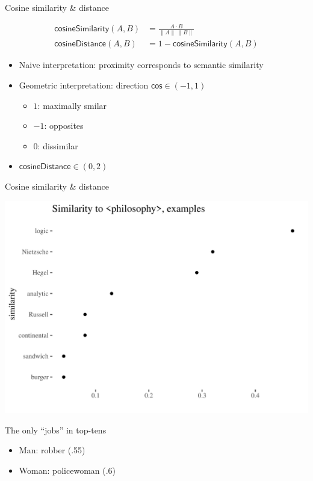 \documentclass[
  10pt,
  ignorenonframetext,
  x11names, dvipsnames, bibspacing,natbib, table]{beamer}
\providecommand{\tightlist}{%
  \setlength{\itemsep}{0pt}\setlength{\parskip}{0pt}}
\begin{document}
\begin{frame}{Cosine similarity \& distance}
\protect\hypertarget{cosine-similarity-distance}{}
\vspace{-4mm}

\begin{align} \tag{Sim}
\mathsf{cosineSimilarity}(A,B) & = \frac{A \cdot B}{\lVert  A \rVert \,\lVert B \rVert}
\\
\tag{Distance}
\mathsf{cosineDistance}(A,B) &  = 1 - \mathsf{cosineSimilarity}(A,B)
\end{align}

\begin{itemize}
\item
  Naive interpretation: proximity corresponds to semantic similarity
\item
  Geometric interpretation: direction \(\mathsf{cos} \in (-1,1)\)

  \begin{itemize}
  \tightlist
  \item
    \(1\): maximally smilar
  \item
    \(-1\): opposites
  \item
    \(0\): dissimilar
  \end{itemize}
\item
  \(\mathsf{cosineDistance}\in (0, 2)\)
\end{itemize}
\end{frame}

\begin{frame}{Cosine similarity \& distance}
\protect\hypertarget{cosine-similarity-distance-1}{}
\begin{center}\includegraphics[width=0.8\linewidth]{presentationBoston_files/figure-beamer/philosophy-1} \end{center}

\pause

\begin{block}{The only ``jobs'' in top-tens}
\protect\hypertarget{the-only-jobs-in-top-tens}{}
\begin{itemize}
\item
  Man: robber (.55)
\item
  Woman: policewoman (.6)
\end{itemize}
\end{block}
\end{frame}
\end{document}
